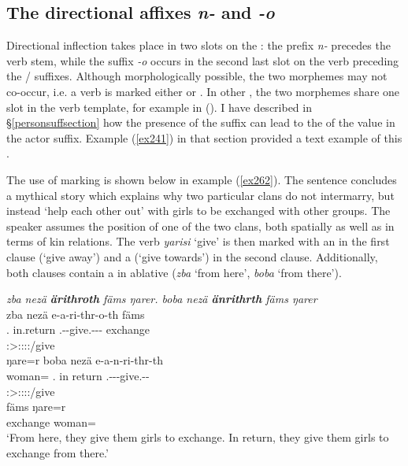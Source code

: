 \subsection{The directional affixes \emph{n-} and \emph{-o}} \label{directionalinflection}

Directional inflection takes place in two slots on the : the  prefix \emph{n-} precedes the verb stem, while the  suffix \emph{-o} occurs in the second last slot on the verb preceding the / suffixes. Although morphologically possible, the two morphemes may not co-occur, i.e. a verb is marked either  or . In other , the two morphemes share one slot in the verb template, for example in  (\citealt{Evans:2015to}). I have described in {\S{}\ref{personsuffsection}} how the presence of the  suffix can lead to the  of the  value in the actor suffix. Example (\ref{ex241}) in that section provided a text example of this .%

The use of  marking is shown below in example (\ref{ex262}). The sentence concludes a mythical story which explains why two particular clans do not intermarry, but instead `help each other out' with girls to be exchanged with other groups. The speaker assumes the position of one of the two clans, both spatially as well as in terms of kin relations. The verb \emph{yarisi} `give' is then marked with an  in the first clause (`give away') and a  (`give towards') in the second clause. Additionally, both clauses contain a  in ablative  (\emph{zba} `from here', \emph{boba} `from there').

\begin{exe}
	\ex \emph{zba nezä \textbf{ärithroth} fäms ŋarer. boba nezä \textbf{änrithrth} fäms ŋarer}\\
	\glll zba nezä e-a-ri-thr-o-th fäms\\
	\Prox.\Abl{} in.return \Stnsg.\Alph-\Vc-give.\Ext-\Ndu-\Andat-\Nsg{} exchange\\
	{} {} \footnotesize{\Stpl:\Sbj>\Stpl:\Io:\Nonpast:\Ipfv:\Andat/give} {}\\
	\sn
	\glll ŋare=r boba nezä e-a-n-ri-thr-th\\
	woman=\Purp{} \Med.\Abl{} {in return} \Stnsg.\Alph-\Vc-\Venit-give.\Ext-\Ndu-\Stnsg{}\\
	{} {} {} \footnotesize{\Stpl:\Sbj>\Stpl:\Io:\Nonpast:\Ipfv:\Venit/give} {} {}\\
	\sn
	\gll fäms ŋare=r\\
	exchange woman=\Purp{}\\
	\trans `From here, they give them girls to exchange. In return, they give them girls to exchange from there.'
	\label{ex262}
\end{exe}

